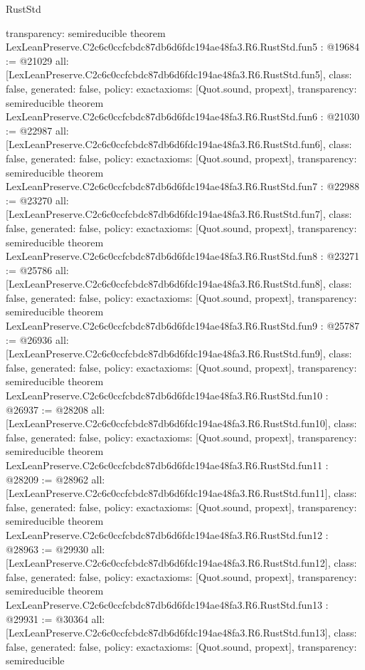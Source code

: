 \begin{lexlean}{RustStd}
\begin{coremodule}
{  transparency: semireducible
}
theorem LexLeanPreserve.C2c6c0ccfcbdc87db6d6fdc194ae48fa3.R6.RustStd.fun5 : @19684 := @21029 {
  all: [LexLeanPreserve.C2c6c0ccfcbdc87db6d6fdc194ae48fa3.R6.RustStd.fun5],
  class: false,
  generated: false,
  policy: exact{axioms: [Quot.sound, propext]},
  transparency: semireducible
}
theorem LexLeanPreserve.C2c6c0ccfcbdc87db6d6fdc194ae48fa3.R6.RustStd.fun6 : @21030 := @22987 {
  all: [LexLeanPreserve.C2c6c0ccfcbdc87db6d6fdc194ae48fa3.R6.RustStd.fun6],
  class: false,
  generated: false,
  policy: exact{axioms: [Quot.sound, propext]},
  transparency: semireducible
}
theorem LexLeanPreserve.C2c6c0ccfcbdc87db6d6fdc194ae48fa3.R6.RustStd.fun7 : @22988 := @23270 {
  all: [LexLeanPreserve.C2c6c0ccfcbdc87db6d6fdc194ae48fa3.R6.RustStd.fun7],
  class: false,
  generated: false,
  policy: exact{axioms: [Quot.sound, propext]},
  transparency: semireducible
}
theorem LexLeanPreserve.C2c6c0ccfcbdc87db6d6fdc194ae48fa3.R6.RustStd.fun8 : @23271 := @25786 {
  all: [LexLeanPreserve.C2c6c0ccfcbdc87db6d6fdc194ae48fa3.R6.RustStd.fun8],
  class: false,
  generated: false,
  policy: exact{axioms: [Quot.sound, propext]},
  transparency: semireducible
}
theorem LexLeanPreserve.C2c6c0ccfcbdc87db6d6fdc194ae48fa3.R6.RustStd.fun9 : @25787 := @26936 {
  all: [LexLeanPreserve.C2c6c0ccfcbdc87db6d6fdc194ae48fa3.R6.RustStd.fun9],
  class: false,
  generated: false,
  policy: exact{axioms: [Quot.sound, propext]},
  transparency: semireducible
}
theorem LexLeanPreserve.C2c6c0ccfcbdc87db6d6fdc194ae48fa3.R6.RustStd.fun10 : @26937 := @28208 {
  all: [LexLeanPreserve.C2c6c0ccfcbdc87db6d6fdc194ae48fa3.R6.RustStd.fun10],
  class: false,
  generated: false,
  policy: exact{axioms: [Quot.sound, propext]},
  transparency: semireducible
}
theorem LexLeanPreserve.C2c6c0ccfcbdc87db6d6fdc194ae48fa3.R6.RustStd.fun11 : @28209 := @28962 {
  all: [LexLeanPreserve.C2c6c0ccfcbdc87db6d6fdc194ae48fa3.R6.RustStd.fun11],
  class: false,
  generated: false,
  policy: exact{axioms: [Quot.sound, propext]},
  transparency: semireducible
}
theorem LexLeanPreserve.C2c6c0ccfcbdc87db6d6fdc194ae48fa3.R6.RustStd.fun12 : @28963 := @29930 {
  all: [LexLeanPreserve.C2c6c0ccfcbdc87db6d6fdc194ae48fa3.R6.RustStd.fun12],
  class: false,
  generated: false,
  policy: exact{axioms: [Quot.sound, propext]},
  transparency: semireducible
}
theorem LexLeanPreserve.C2c6c0ccfcbdc87db6d6fdc194ae48fa3.R6.RustStd.fun13 : @29931 := @30364 {
  all: [LexLeanPreserve.C2c6c0ccfcbdc87db6d6fdc194ae48fa3.R6.RustStd.fun13],
  class: false,
  generated: false,
  policy: exact{axioms: [Quot.sound, propext]},
  transparency: semireducible
}
\end{coremodule}
\end{lexlean}
